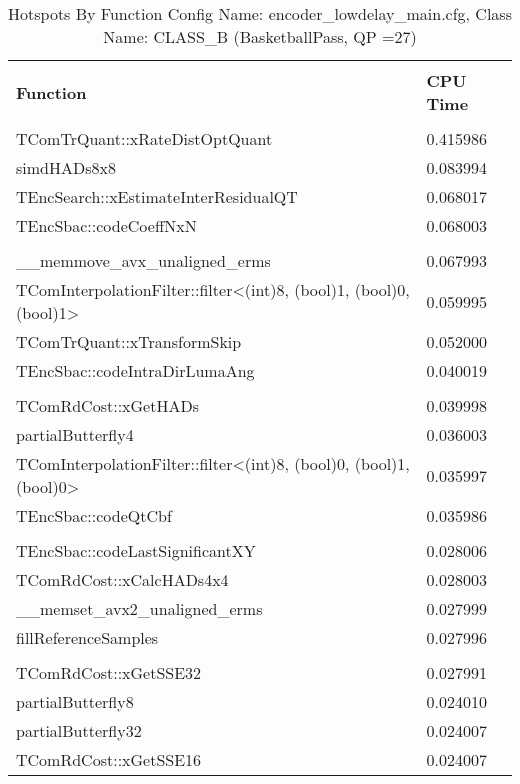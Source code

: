 \documentclass{article}%
\begin{document}
\begin{longtabu}{| X[l] | X[l] |}%
\caption{%
Hotspots By Function\newline%
 Config Name: encoder\_lowdelay\_main.cfg,\newline%
 Class Name: CLASS\_B\newline%
 (BasketballPass, QP =27)%
}%
\hline%
&\\%
\textbf{Function}&\textbf{CPU Time}\\%
&\\%
\hline%
\endhead%
TComTrQuant::xRateDistOptQuant&0.415986\\%
\hline%
simdHADs8x8&0.083994\\%
\hline%
TEncSearch::xEstimateInterResidualQT&0.068017\\%
\hline%
TEncSbac::codeCoeffNxN&0.068003\\%
\hline%
&\\%
\hline%
\_\_memmove\_avx\_unaligned\_erms&0.067993\\%
\hline%
TComInterpolationFilter::filter<(int)8, (bool)1, (bool)0, (bool)1>&0.059995\\%
\hline%
TComTrQuant::xTransformSkip&0.052000\\%
\hline%
TEncSbac::codeIntraDirLumaAng&0.040019\\%
\hline%
&\\%
\hline%
TComRdCost::xGetHADs&0.039998\\%
\hline%
partialButterfly4&0.036003\\%
\hline%
TComInterpolationFilter::filter<(int)8, (bool)0, (bool)1, (bool)0>&0.035997\\%
\hline%
TEncSbac::codeQtCbf&0.035986\\%
\hline%
&\\%
\hline%
TEncSbac::codeLastSignificantXY&0.028006\\%
\hline%
TComRdCost::xCalcHADs4x4&0.028003\\%
\hline%
\_\_memset\_avx2\_unaligned\_erms&0.027999\\%
\hline%
fillReferenceSamples&0.027996\\%
\hline%
&\\%
\hline%
TComRdCost::xGetSSE32&0.027991\\%
\hline%
partialButterfly8&0.024010\\%
\hline%
partialButterfly32&0.024007\\%
\hline%
TComRdCost::xGetSSE16&0.024007\\%
\hline%
\end{longtabu}%
\newpage%
\end{document}
